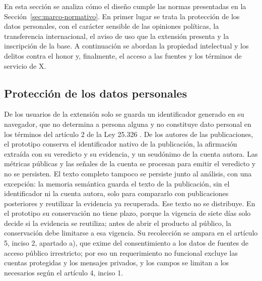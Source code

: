 En esta sección se analiza cómo el diseño cumple las normas presentadas en la Sección~\ref{sec:marco-normativo}. En primer lugar se trata la protección de los datos personales, con el carácter sensible de las opiniones políticas, la transferencia internacional, el aviso de uso que la extensión presenta y la inscripción de la base. A continuación se abordan la propiedad intelectual y los delitos contra el honor y, finalmente, el acceso a las fuentes y los términos de servicio de X.

\subsection{Protección de los datos personales}

De los usuarios de la extensión solo se guarda un identificador generado en su navegador, que no determina a persona alguna y no constituye dato personal en los términos del artículo 2 de la Ley 25.326 \parencite{CongresoNacion2000}. De los autores de las publicaciones, el prototipo conserva el identificador nativo de la publicación, la afirmación extraída con su veredicto y su evidencia, y un seudónimo de la cuenta autora. Las métricas públicas y las señales de la cuenta se procesan para emitir el veredicto y no se persisten. El texto completo tampoco se persiste junto al análisis, con una excepción: la memoria semántica guarda el texto de la publicación, sin el identificador ni la cuenta autora, solo para compararlo con publicaciones posteriores y reutilizar la evidencia ya recuperada. Ese texto no se distribuye. En el prototipo su conservación no tiene plazo, porque la vigencia de siete días solo decide si la evidencia se reutiliza; antes de abrir el producto al público, la conservación debe limitarse a esa vigencia. Su recolección se ampara en el artículo 5, inciso 2, apartado a), que exime del consentimiento a los datos de fuentes de acceso público irrestricto; por eso un requerimiento no funcional excluye las cuentas protegidas y los mensajes privados, y los campos se limitan a los necesarios según el artículo 4, inciso 1.

